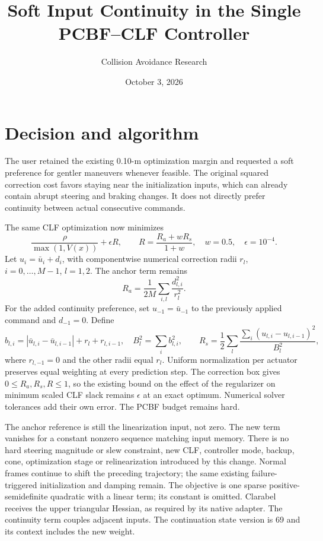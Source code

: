 \documentclass[10pt]{article}
\title{Soft Input Continuity in the Single PCBF--CLF Controller}
\author{Collision Avoidance Research}
\date{October 3, 2026}
\begin{document}
\maketitle
\section{Decision and algorithm}
The user retained the existing 0.10-m optimization margin and requested a soft
preference for gentler maneuvers whenever feasible. The original squared
correction cost favors staying near the initialization inputs, which can
already contain abrupt steering and braking changes. It does not directly
prefer continuity between actual consecutive commands.

The same CLF optimization now minimizes
\[
 \frac{\rho}{\max(1,V(x))}+\epsilon R,\qquad
 R=\frac{R_a+wR_s}{1+w},\quad w=0.5,\quad\epsilon=10^{-4}.
\]
Let $u_i=\bar u_i+d_i$, with componentwise numerical correction radii $r_l$,
$i=0,\ldots,M-1$, $l=1,2$. The anchor term remains
\[
 R_a=\frac{1}{2M}\sum_{i,l}\frac{d_{l,i}^2}{r_l^2}.
\]
For the added continuity preference, set $u_{-1}=\bar u_{-1}$ to the previously
applied command and $d_{-1}=0$. Define
\[
 b_{l,i}=|\bar u_{l,i}-\bar u_{l,i-1}|+r_l+r_{l,i-1},\quad
 B_l^2=\sum_i b_{l,i}^2,\qquad
 R_s=\frac12\sum_l\frac{\sum_i(u_{l,i}-u_{l,i-1})^2}{B_l^2},
\]
where $r_{l,-1}=0$ and the other radii equal $r_l$. Uniform normalization per
actuator preserves equal weighting at every prediction step. The correction
box gives $0\le R_a,R_s,R\le1$, so the existing bound on the effect of the
regularizer on minimum scaled CLF slack remains $\epsilon$ at an exact optimum.
Numerical solver tolerances add their own error. The PCBF budget remains hard.

The anchor reference is still the linearization input, not zero. The new term
vanishes for a constant nonzero sequence matching input memory. There is no
hard steering magnitude or slew constraint, new CLF, controller mode, backup,
cone, optimization stage or relinearization introduced by this change.
Normal frames continue to shift the preceding trajectory; the same existing
failure-triggered initialization and damping remain. The objective is one
sparse positive-semidefinite quadratic with a linear term; its constant is
omitted. Clarabel receives the upper triangular Hessian, as required by its
native adapter. The continuity term couples adjacent inputs. The continuation
state version is 69 and its context includes the new weight.
\end{document}
